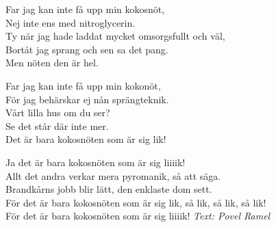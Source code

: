 \vspace{10pt}
Far jag kan inte få upp min kokosnöt,\\
Nej inte ens med nitroglycerin.\\
Ty när jag hade laddat mycket omsorgsfullt och väl,\\
Bortåt jag sprang och sen sa det pang.\\
Men nöten den är hel.\par
\vspace{10pt}
Far jag kan inte få upp min kokonöt,\\
För jag behärskar ej nån sprängteknik.\\
Vårt lilla hus om du ser?\\
Se det står där inte mer.\\
Det är bara kokosnöten som är sig lik!\par
\vspace{10pt}
Ja det är bara kokosnöten som är sig liiiik!\\
Allt det andra verkar mera pyromanik, så att säga.\\
Brandkårns jobb blir lätt, den enklaste dom sett.\\
För det är bara kokosnöten som är sig lik, så lik, så lik, så lik!\\
För det är bara kokosnöten som är sig liiiik!
\vspace{10pt}
{\footnotesize\textit{Text: Povel Ramel}}
